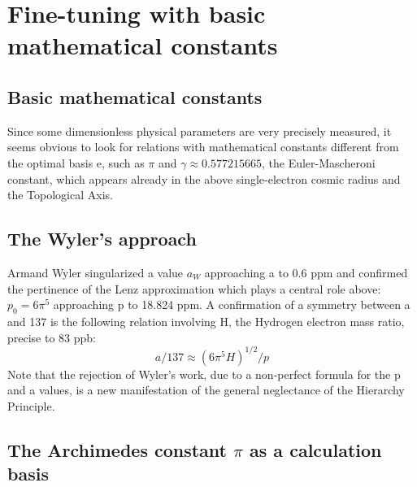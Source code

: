 \chapter{Fine-tuning with basic mathematical constants}
\label{chap:chapter_3}
\section {Basic mathematical constants}

Since some dimensionless physical parameters are very precisely measured, it seems obvious to look for
relations with mathematical constants different from the optimal basis e, such as $\pi$ and $\gamma \approx
0.577215665$, the Euler-Mascheroni constant, which appears already in the above single-electron
cosmic radius and the Topological Axis.

\section {The Wyler's approach}

Armand Wyler singularized a value $a_{W}$ approaching a to 0.6 ppm and confirmed the pertinence
of the Lenz approximation which plays a central role above: $p_{0} = 6\pi^{5}$ approaching p to 18.824 ppm.
A confirmation of a symmetry between a and 137 is the following relation involving H, the
Hydrogen electron mass ratio, precise to 83 ppb:
$$a/137 ≈ (6\pi^{5} H)^{1/2} /p$$
Note that the rejection of Wyler's work, due to a non-perfect formula for the p and a values, is a new
manifestation of the general neglectance of the Hierarchy Principle.

\section {The Archimedes constant $\pi$ as a calculation basis}

